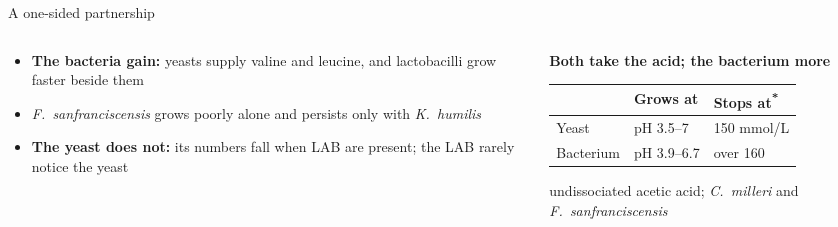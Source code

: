 \documentclass[aspectratio=169,11pt]{beamer}
\begin{document}
\begin{frame}{A one-sided partnership}
  \begin{columns}[T]
    \begin{column}{0.56\textwidth}
      \small
      \begin{itemize}\setlength{\itemsep}{2pt}
        \item \textbf{The bacteria gain:} yeasts supply valine and leucine, and lactobacilli grow faster beside them
        \item \textit{F.\ sanfranciscensis} grows poorly alone and persists only with \textit{K.\ humilis}
        \item \textbf{The yeast does not:} its numbers fall when LAB are present; the LAB rarely notice the yeast
      \end{itemize}
    \end{column}
    \begin{column}{0.40\textwidth}
      \footnotesize
      \textbf{Both take the acid; the bacterium more}\par\smallskip
      \begin{tabular}{@{}lll@{}}
        \toprule
        & Grows at & Stops at\textsuperscript{*} \\
        \midrule
        Yeast & pH 3.5--7 & 150 mmol/L \\
        Bacterium & pH 3.9--6.7 & over 160 \\
        \bottomrule
      \end{tabular}\par\smallskip
      {\tiny * undissociated acetic acid; \textit{C.\ milleri} and \textit{F.\ sanfranciscensis}}
    \end{column}
  \end{columns}
\end{frame}
\end{document}
